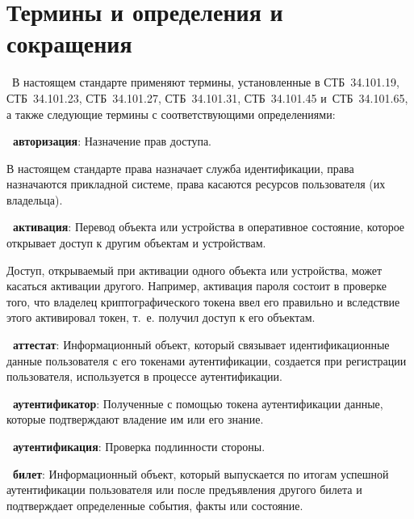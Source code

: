 \chapter{Термины и определения и сокращения}\label{TERMS}


\thesection~В настоящем стандарте применяют термины, установленные 
в СТБ~34.101.19, СТБ~34.101.23, СТБ~34.101.27, СТБ~34.101.31, СТБ~34.101.45 
и~СТБ~34.101.65, а также следующие термины с соответствующими определениями:

{\bf \thedefctr~авторизация}:
Назначение прав доступа.

\begin{note*}
В настоящем стандарте права назначает служба идентификации,
права назначаются прикладной системе, права касаются ресурсов пользователя
(их владельца).
\end{note*}

{\bf \thedefctr~активация}:
Перевод объекта или устройства в оперативное состояние,
которое открывает доступ к другим объектам и устройствам. 

\begin{note*}
Доступ, открываемый при активации одного объекта или устройства,
может касаться активации другого.
%
Например, активация пароля состоит в проверке того, что 
владелец криптографического токена ввел его правильно 
и вследствие этого активировал токен, т.~е. получил доступ к его объектам.  
\end{note*}

{\bf \thedefctr~аттестат}:
Информационный объект, который связывает идентификационные 
данные пользователя с его токенами аутентификации,
создается при регистрации пользователя,
используется в процессе аутентификации.

{\bf \thedefctr~аутентификатор}:
Полученные с помощью токена аутентификации данные, 
которые подтверждают владение им или его знание. 

{\bf \thedefctr~аутентификация}:
Проверка подлинности стороны.


{\bf \thedefctr~билет}:
Информационный объект, который выпускается по итогам успешной аутентификации
пользователя или после предъявления другого билета и подтверждает определенные  
события, факты или состояние.


